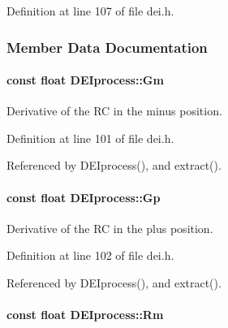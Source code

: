 Definition at line 107 of file dei.h.



\subsubsection{Member Data Documentation}
\hypertarget{classDEIprocess_a769738a97b0bb4ff0e378d1818ce288f}{
\paragraph[{Gm}]{\setlength{\rightskip}{0pt plus 5cm}const float {\bf DEIprocess::Gm}}\hfill}
\label{classDEIprocess_a769738a97b0bb4ff0e378d1818ce288f}


Derivative of the RC in the minus position. 



Definition at line 101 of file dei.h.



Referenced by DEIprocess(), and extract().

\hypertarget{classDEIprocess_ae63dfc36be988c4bdbdf914377139cf0}{
\paragraph[{Gp}]{\setlength{\rightskip}{0pt plus 5cm}const float {\bf DEIprocess::Gp}}\hfill}
\label{classDEIprocess_ae63dfc36be988c4bdbdf914377139cf0}


Derivative of the RC in the plus position. 



Definition at line 102 of file dei.h.



Referenced by DEIprocess(), and extract().

\hypertarget{classDEIprocess_a0fa7581497fa2c98fd05bc4f5522f05b}{
\paragraph[{Rm}]{\setlength{\rightskip}{0pt plus 5cm}const float {\bf DEIprocess::Rm}}\hfill}
\label{classDEIprocess_a0fa7581497fa2c98fd05bc4f5522f05b}


